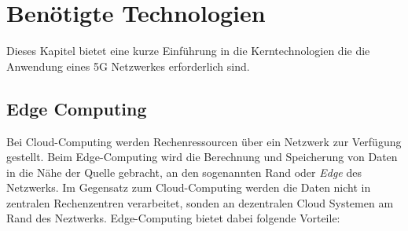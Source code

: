 \documentclass[runningheads]{llncs}
\numberwithin{figure}{section}
\begin{document}
\newpage
\section{Benötigte Technologien}
\label{sec:Benötigte Technologien}
Dieses Kapitel bietet eine kurze Einführung in die Kerntechnologien die die Anwendung eines 5G Netzwerkes erforderlich sind.
\subsection{Edge Computing}
\label{sub:Edge Computing}
Bei Cloud-Computing werden Rechenressourcen über ein Netzwerk zur Verfügung gestellt.
Beim Edge-Computing wird die Berechnung und Speicherung von Daten in die Nähe der Quelle gebracht,
an den sogenannten Rand oder \textit{Edge} des Netzwerks. Im Gegensatz zum Cloud-Computing werden die Daten
nicht in zentralen Rechenzentren verarbeitet, sonden an dezentralen Cloud Systemen am Rand des Neztwerks. 
Edge-Computing bietet dabei folgende Vorteile: \cite{labrieTopBenefitsEdge}
\end{document}
